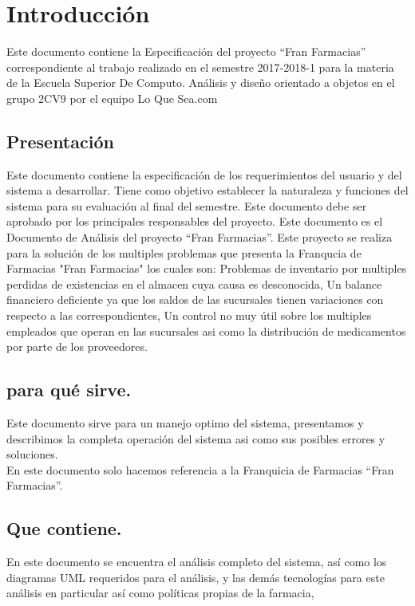 \chapter{Introducción}
Este documento contiene la Especificación del proyecto “Fran Farmacias” correspondiente al trabajo realizado en el
semestre 2017-2018-1 para la materia de la Escuela Superior De Computo. Análisis y diseño orientado a objetos en el
grupo 2CV9 por el equipo Lo Que Sea.com

\section{Presentación}

Este documento contiene la especificación de los requerimientos del usuario y del sistema a desarrollar.
Tiene como objetivo establecer la naturaleza y funciones del sistema para su evaluación al final del semestre. 
Este documento debe ser aprobado por los principales responsables del proyecto.
Este documento es el Documento de Análisis del proyecto “Fran Farmacias”.
Este proyecto se realiza para la solución de los multiples problemas que presenta la Franqucia de Farmacias "Fran Farmacias" los cuales son: Problemas de inventario por multiples perdidas de existencias en el almacen cuya causa es desconocida, Un balance financiero deficiente ya que los saldos de las sucursales tienen variaciones con respecto a las correspondientes, Un control no muy útil sobre los multiples empleados que operan en las sucursales asi como la distribución de medicamentos por parte de los proveedores.

\section{para qué sirve.}
Este documento sirve para un manejo optimo del sistema, presentamos y describimos la completa operación del sistema asi como sus posibles errores y soluciones.\\
En este documento solo hacemos referencia a la Franquicia de Farmacias “Fran Farmacias”.
\section{Que contiene.}
En este documento se encuentra el análisis completo del sistema, así como los diagramas UML requeridos para el análisis, y las demás tecnologías para este análisis en particular así como políticas propias de la farmacia,
